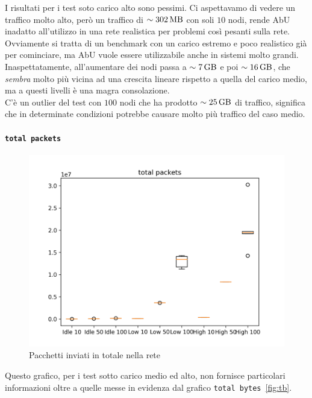 \documentclass[12pt, a4paper]{article}
\begin{document}
I risultati per i test soto carico alto sono pessimi. Ci aspettavamo di vedere un traffico molto alto, però un traffico di $\sim\qty{302}{\mega\byte}$ con soli $10$ nodi, rende AbU inadatto all'utilizzo in una rete realistica per problemi così pesanti sulla rete.
Ovviamente si tratta di un benchmark con un carico estremo e poco realistico già per cominciare, ma AbU vuole essere utilizzabile anche in sistemi molto grandi.\\
Inaspettatamente, all'aumentare dei nodi passa a $\sim\qty{7}{\giga\byte}$ e poi $\sim\qty{16}{\giga\byte}$, che \emph{sembra} molto più vicina ad una crescita lineare rispetto a quella del carico medio, ma a questi livelli è una magra consolazione.\\
C'è un outlier del test con $100$ nodi che ha prodotto $\sim\qty{25}{\giga\byte}$ di traffico, significa che in determinate condizioni potrebbe causare molto più traffico del caso medio.

\paragraph{\lstinline{total packets}}

\begin{figure}[H]
    \includegraphics[width=\linewidth, keepaspectratio]{graphs/total packets.png}
    \caption{Pacchetti inviati in totale nella rete}
    \label{fig:tp}
\end{figure}

Questo grafico, per i test sotto carico medio ed alto, non fornisce particolari informazioni oltre a quelle messe in evidenza dal grafico \lstinline{total bytes}~\ref{fig:tb}.
\end{document}
